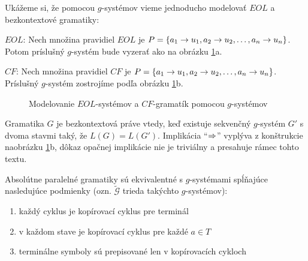 \begin{priklad}
  Ukážeme si, že pomocou $g$-systémov vieme jednoducho modelovať
  $EOL$ a bezkontextové gramatiky:
  \begin{description}
    \item{$EOL$:} Nech množina pravidiel $EOL$ je
        $P=\{ a_1\rightarrow u_1,a_2\rightarrow u_2,\dots,a_n\rightarrow
        u_n\}$.
        Potom príslušný $g$-systém bude vyzerať ako na obrázku
        \ref{fig:eol-to-gsystem}a.

    \item{$CF$:} Nech množina pravidiel $CF$ je
        $P=\{a_1\rightarrow u_1, a_2\rightarrow u_2,\dots,a_n\rightarrow
        u_n\}$. Príslušný $g$-systém zostrojíme podľa obrázku
        \ref{fig:eol-to-gsystem}b.
  \end{description}

  \begin{figure}[!ht]
    \centering
    \caption{Modelovanie $EOL$-systémov a
                $CF$-gramatík pomocou $g$-systémov}
    \label{fig:eol-to-gsystem}
  \end{figure}
\end{priklad}

\begin{poznamka}
  Gramatika $G$ je bezkontextová práve vtedy, keď existuje sekvenčný
  $g$-systém $G'$ s dvoma stavmi taký, že $L(G)=L(G')$. Implikácia
  ``$\Rightarrow$'' vyplýva z konštrukcie na\linebreak obrázku \ref{fig:eol-to-gsystem}b,
  dôkaz opačnej implikácie nie je triviálny a presahuje rámec tohto
  textu.
\end{poznamka}

\begin{veta}
  Absolútne paralelné gramatiky sú ekvivalentné s $g$-systémami
  spĺňajúce nasledujúce podmienky (ozn. $\tilde{\mathcal{G}}$ trieda
  takýchto $g$-systémov):
  \begin{enumerate}
    \item každý cyklus je kopírovací cyklus pre terminál
    \item v každom stave je kopírovací cyklus pre každé $a\in T$
    \item terminálne symboly sú prepisované len v kopírovacích cykloch
  \end{enumerate}
\end{veta}

